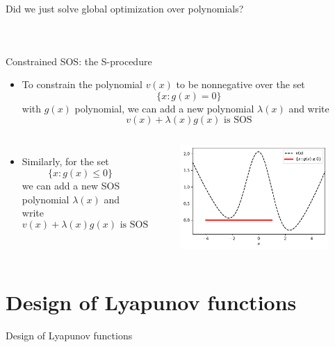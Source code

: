 \documentclass[aspectratio=169]{beamer}
\begin{document}
\begin{frame}{Did we just solve global optimization over polynomials?}
\begin{columns}
\begin{figure}
{}
\end{figure}
\end{columns}
\end{frame}

\begin{frame}{Constrained SOS: the S-procedure}
\begin{itemize}
\item
To constrain the polynomial $v(x)$ to be nonnegative over the set
$$
\{ x :  g(x) = 0 \}
$$
with $g(x)$ polynomial, we can add a new polynomial $\lambda(x)$ and write
$$
v(x) + \lambda(x) g(x) \text{ is SOS}
$$
\end{itemize}
\pause
\begin{columns}
\begin{itemize}
\item
Similarly, for the set
$$
\{ x :  g(x) \leq 0 \}
$$
we can add a new SOS polynomial $\lambda(x)$ and write
$$
v(x) + \lambda(x) g(x) \text{ is SOS}
$$
\end{itemize}
\begin{figure}
\includegraphics[width=\columnwidth]{figures/s_procedure.pdf}
\end{figure}
\end{columns}
\end{frame}

\section{Design of Lyapunov functions}
\begin{frame}
\huge
\centering
{\color{darkred} Design of Lyapunov functions}
\end{frame}
\end{document}
